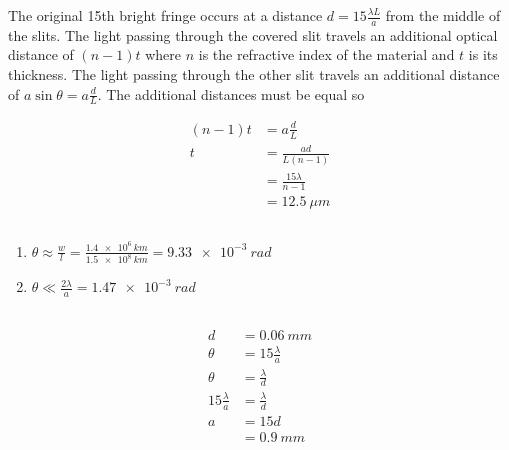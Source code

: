 \documentclass{article}
\begin{document}
The original 15th bright fringe occurs at a distance $d = 15 \frac{\lambda L}{a}$ from the middle of the slits. The light passing through the covered slit travels an additional optical distance of $(n - 1) t$ where $n$ is the refractive index of the material and $t$ is its thickness. The light passing through the other slit travels an additional distance of $a \sin \theta = a \frac{d}{L}$. The additional distances must be equal so

\begin{align*}
  (n - 1) t & = a \frac{d}{L}            \\
  t         & = \frac{a d}{L (n - 1)}    \\
            & = \frac{15 \lambda}{n - 1} \\
            & = \qty{12.5}{\mu m}
\end{align*}

\subsection{}

\begin{enumerate}
  \item $\theta \approx \frac{w}{l} = \frac{\qty{1.4e6}{km}}{\qty{1.5e8}{km}} = \qty{9.33e-3}{rad}$

  \item $\theta \ll \frac{2 \lambda}{a} = \qty{1.47e-3}{rad}$
\end{enumerate}

\subsection{}

\begin{align*}
  d                    & = \qty{0.06}{mm}       \\
  \theta               & = 15 \frac{\lambda}{a} \\
  \theta               & = \frac{\lambda}{d}    \\
  15 \frac{\lambda}{a} & = \frac{\lambda}{d}    \\
  a                    & = 15 d                 \\
                       & = \qty{0.9}{mm}
\end{align*}

\subsection{}
\end{document}

